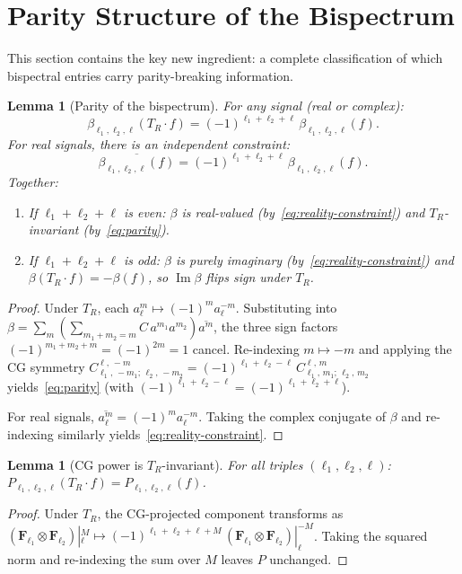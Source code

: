 \documentclass[11pt]{article}
\newtheorem{lemma}[theorem]{Lemma}
\DeclareMathOperator{\im}{Im}
\newcommand{\CG}[6]{C^{#5,\,#6}_{#1,\,#2;\,#3,\,#4}}
\newcommand{\conj}[1]{\overline{#1}}
\begin{document}
\section{Parity Structure of the Bispectrum}

This section contains the key new ingredient: a complete classification of
which bispectral entries carry parity-breaking information.

\begin{lemma}[Parity of the bispectrum]\label{lem:parity}
For any signal (real or complex):
\begin{equation}\label{eq:parity}
  \beta_{\ell_1,\ell_2,\ell}(T_R \cdot f)
  = (-1)^{\ell_1+\ell_2+\ell}\,\beta_{\ell_1,\ell_2,\ell}(f).
\end{equation}
For \emph{real} signals, there is an independent constraint:
\begin{equation}\label{eq:reality-constraint}
  \conj{\beta_{\ell_1,\ell_2,\ell}(f)}
  = (-1)^{\ell_1+\ell_2+\ell}\,\beta_{\ell_1,\ell_2,\ell}(f).
\end{equation}
Together:
\begin{enumerate}[nosep,label=(\alph*)]
\item If $\ell_1+\ell_2+\ell$ is even:
  $\beta$ is real-valued (by~\eqref{eq:reality-constraint})
  and $T_R$-invariant (by~\eqref{eq:parity}).
\item If $\ell_1+\ell_2+\ell$ is odd:
  $\beta$ is purely imaginary (by~\eqref{eq:reality-constraint})
  and $\beta(T_R \cdot f) = -\beta(f)$, so $\im\beta$ flips sign under $T_R$.
\end{enumerate}
\end{lemma}
\begin{proof}
Under $T_R$, each $a_\ell^m \mapsto (-1)^m a_\ell^{-m}$.
Substituting into $\beta = \sum_m (\sum_{m_1+m_2=m} C\, a^{m_1} a^{m_2})
\conj{a^m}$, the three sign factors $(-1)^{m_1+m_2+m} = (-1)^{2m} = 1$
cancel. Re-indexing $m \mapsto -m$ and applying the CG symmetry
$\CG{\ell_1}{-m_1}{\ell_2}{-m_2}{\ell}{-m}
  = (-1)^{\ell_1+\ell_2-\ell}\,\CG{\ell_1}{m_1}{\ell_2}{m_2}{\ell}{m}$
yields~\eqref{eq:parity} (with $(-1)^{\ell_1+\ell_2-\ell} = (-1)^{\ell_1+\ell_2+\ell}$).

For real signals, $\conj{a_\ell^m} = (-1)^m a_\ell^{-m}$.
Taking the complex conjugate of $\beta$ and re-indexing similarly
yields~\eqref{eq:reality-constraint}.
\end{proof}

\begin{lemma}[CG power is $T_R$-invariant]\label{lem:P-invariant}
For all triples $(\ell_1,\ell_2,\ell)$:
$P_{\ell_1,\ell_2,\ell}(T_R \cdot f) = P_{\ell_1,\ell_2,\ell}(f)$.
\end{lemma}
\begin{proof}
Under $T_R$, the CG-projected component transforms as
$(\mathbf{F}_{\ell_1} \otimes \mathbf{F}_{\ell_2})|_\ell^M
  \mapsto (-1)^{\ell_1+\ell_2+\ell+M}\,
  (\mathbf{F}_{\ell_1} \otimes \mathbf{F}_{\ell_2})|_\ell^{-M}$.
Taking the squared norm and re-indexing the sum over $M$
leaves $P$ unchanged.
\end{proof}
\end{document}
